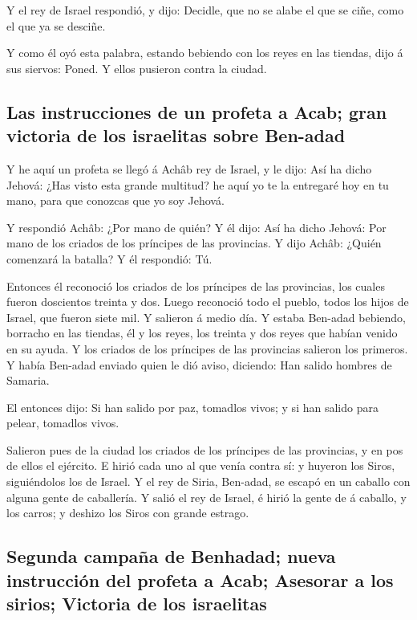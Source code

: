  Y el rey de Israel respondió, y dijo: Decidle, que no se
alabe el que se ciñe, como el que ya se desciñe.

 Y como él oyó esta palabra, estando bebiendo con los
reyes en las tiendas, dijo á sus siervos: Poned. Y ellos pusieron contra
la ciudad.

\hypertarget{las-instrucciones-de-un-profeta-a-acab-gran-victoria-de-los-israelitas-sobre-ben-adad}{%
\subsection{Las instrucciones de un profeta a Acab; gran victoria de los
israelitas sobre
Ben-adad}\label{las-instrucciones-de-un-profeta-a-acab-gran-victoria-de-los-israelitas-sobre-ben-adad}}

 Y he aquí un profeta se llegó á Achâb rey de Israel, y
le dijo: Así ha dicho Jehová: ¿Has visto esta grande multitud? he aquí
yo te la entregaré hoy en tu mano, para que conozcas que yo soy Jehová.

 Y respondió Achâb: ¿Por mano de quién? Y él dijo: Así ha
dicho Jehová: Por mano de los criados de los príncipes de las
provincias. Y dijo Achâb: ¿Quién comenzará la batalla? Y él respondió:
Tú.

 Entonces él reconoció los criados de los príncipes de
las provincias, los cuales fueron doscientos treinta y dos. Luego
reconoció todo el pueblo, todos los hijos de Israel, que fueron siete
mil.  Y salieron á medio día. Y estaba Ben-adad bebiendo,
borracho en las tiendas, él y los reyes, los treinta y dos reyes que
habían venido en su ayuda.  Y los criados de los
príncipes de las provincias salieron los primeros. Y había Ben-adad
enviado quien le dió aviso, diciendo: Han salido hombres de Samaria.

 El entonces dijo: Si han salido por paz, tomadlos vivos;
y si han salido para pelear, tomadlos vivos.

 Salieron pues de la ciudad los criados de los príncipes
de las provincias, y en pos de ellos el ejército.  E
hirió cada uno al que venía contra sí: y huyeron los Siros, siguiéndolos
los de Israel. Y el rey de Siria, Ben-adad, se escapó en un caballo con
alguna gente de caballería.  Y salió el rey de Israel, é
hirió la gente de á caballo, y los carros; y deshizo los Siros con
grande estrago.

\hypertarget{segunda-campauxf1a-de-benhadad-nueva-instrucciuxf3n-del-profeta-a-acab-asesorar-a-los-sirios-victoria-de-los-israelitas}{%
\subsection{Segunda campaña de Benhadad; nueva instrucción del profeta a
Acab; Asesorar a los sirios; Victoria de los
israelitas}\label{segunda-campauxf1a-de-benhadad-nueva-instrucciuxf3n-del-profeta-a-acab-asesorar-a-los-sirios-victoria-de-los-israelitas}}

